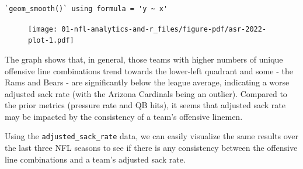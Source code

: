 \documentclass[
  letterpaper,
]{krantz}
\begin{document}
\begin{verbatim}
`geom_smooth()` using formula = 'y ~ x'
\end{verbatim}

\begin{figure}[H]

{\centering \texttt{[image: 01-nfl-analytics-and-r\_files/figure-pdf/asr-2022-plot-1.pdf]}

}

\end{figure}

The graph shows that, in general, those teams with higher numbers of
unique offensive line combinations trend towards the lower-left quadrant
and some - the Rams and Bears - are significantly below the league
average, indicating a worse adjusted sack rate (with the Arizona
Cardinals being an outlier). Compared to the prior metrics (pressure
rate and QB hits), it seems that adjusted sack rate may be impacted by
the consistency of a team's offensive linemen.

Using the \texttt{adjusted\_sack\_rate} data, we can easily visualize
the same results over the last three NFL seasons to see if there is any
consistency between the offensive line combinations and a team's
adjusted sack rate.
\end{document}
